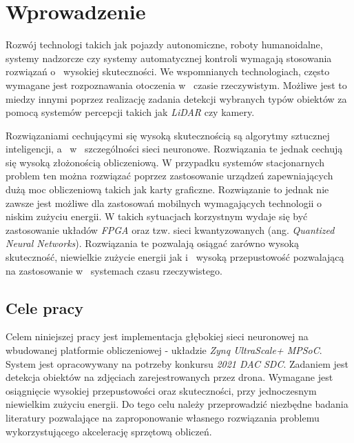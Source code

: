 \chapter{Wprowadzenie}
\label{cha:wprowadzenie}

Rozwój technologi takich jak pojazdy autonomiczne, roboty humanoidalne, systemy nadzorcze czy systemy automatycznej kontroli wymagają stosowania rozwiązań o~ wysokiej skuteczności.
We wspomnianych technologiach, często wymagane jest rozpoznawania otoczenia w~ czasie rzeczywistym.
Możliwe jest to miedzy innymi poprzez realizację zadania detekcji wybranych typów obiektów za pomocą systemów percepcji takich jak \emph{LiDAR} czy kamery. 

Rozwiązaniami cechującymi się wysoką skutecznością są algorytmy sztucznej inteligencji, a~ w~ szczególności sieci neuronowe.
Rozwiązania te jednak cechują się wysoką złożonością obliczeniową.
W przypadku systemów stacjonarnych problem ten można rozwiązać poprzez zastosowanie urządzeń zapewniających dużą moc obliczeniową takich jak karty graficzne.
Rozwiązanie to jednak nie zawsze jest możliwe dla zastosowań mobilnych wymagających technologii o~ niskim zużyciu energii.
W takich sytuacjach korzystnym wydaje się być zastosowanie układów \emph{FPGA}
oraz tzw. sieci kwantyzowanych (ang. \emph{Quantized Neural Networks}).
Rozwiązania te pozwalają osiągać zarówno wysoką skuteczność, niewielkie zużycie energii jak i~ wysoką przepustowość pozwalającą na zastosowanie w~ systemach czasu rzeczywistego.

\section{Cele pracy}
\label{sec:celePracy}
Celem niniejszej pracy jest implementacja głębokiej sieci neuronowej na wbudowanej platformie obliczeniowej - układzie \emph{Zynq UltraScale+ MPSoC}.
System jest opracowywany na potrzeby konkursu \emph{2021 DAC SDC}.
Zadaniem jest detekcja obiektów na zdjęciach zarejestrowanych przez drona. 
Wymagane jest osiągnięcie wysokiej przepustowości oraz skuteczności, przy jednoczesnym niewielkim zużyciu energii. 
Do tego celu należy przeprowadzić niezbędne badania literatury pozwalające na zaproponowanie własnego rozwiązania problemu wykorzystującego akcelerację sprzętową obliczeń.


